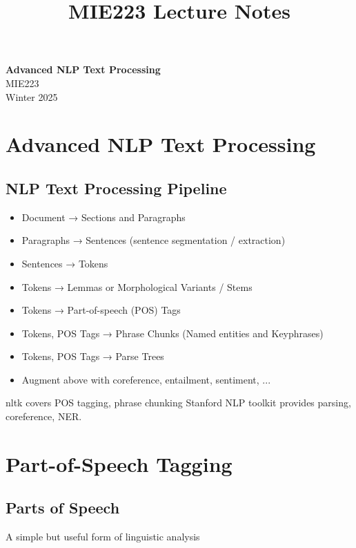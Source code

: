\documentclass[11pt]{article}
\theoremstyle{definition}
\begin{document}
\setcounter{section}{0}
\title{MIE223 Lecture Notes}

\thispagestyle{empty}

\begin{center}
{\LARGE \bf Advanced NLP Text Processing}\\
{\large MIE223}\\
Winter 2025
\end{center}
\section{Advanced NLP Text Processing}
\subsection{NLP Text Processing Pipeline}
\begin{itemize}
  \item Document → Sections and Paragraphs
  \item Paragraphs → Sentences (sentence segmentation / extraction)
  \item Sentences → Tokens
  \item Tokens → Lemmas or Morphological Variants / Stems
  \item Tokens → Part-of-speech (POS) Tags
  \item Tokens, POS Tags → Phrase Chunks (Named entities and Keyphrases)
  \item Tokens, POS Tags → Parse Trees
  \item Augment above with coreference, entailment, sentiment, ...
\end{itemize}

nltk covers POS tagging,
phrase chunking
Stanford NLP toolkit
provides parsing,
coreference, NER.
\section{Part-of-Speech Tagging}

\subsection{Parts of Speech}
A simple but useful form of
linguistic analysis
\end{document}
